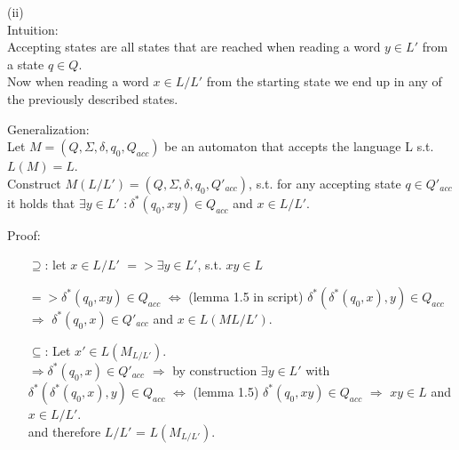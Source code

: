 \noindent (ii)\\
Intuition:\\
Accepting states are all states that are reached when reading a word $y \in L'$ from a state $q \in Q$.\\
Now when reading a word $x \in L/L'$ from the starting state we end up in any of the previously described states.

Generalization:\\
Let $M = (Q, \Sigma, \delta, q_0, Q_{acc})$ be an automaton that accepts the language L s.t. $L(M) = L$.\\
Construct $M(L/L') = (Q, \Sigma, \delta, q_0, Q'_{acc})$, s.t. for any accepting state $q \in Q'_{acc}$  it holds that  $\exists y \in L'$  $: \delta^*(q_0,xy) \in Q_{acc}$ and $x \in L/L'$.

Proof:
\begin{itemize}
    \item[$\supseteq$:] let $x \in L / L'$
      $=> \exists y \in L'$, s.t. $xy \in L$

     $ => \delta^{*}(q_0 , xy) \in Q_{acc}$ $\Leftrightarrow$ (lemma 1.5 in script) $ \delta^{*}(\delta^{*}(q_0, x),y) \in Q_{acc}$  $\Rightarrow$ $ \delta^{*}(q_0,x) \in Q'_{acc}$ and $x \in L(M{L/L'})$.

    \item[$\subseteq$:] Let $x' \in L(M_{L/L'})$.\\
    $\Rightarrow \delta^{*}(q_0, x) \in Q'_{acc}$ $\Rightarrow$ by construction $\exists y \in L'$ with $\delta^{*}(\delta^{*}(q_0,x), y) \in Q_{acc}$ $\Leftrightarrow$ (lemma 1.5) $\delta^{*}(q_0, xy) \in Q_{acc}$ $\Rightarrow$ $xy \in L$ and $x \in L / L'$. \\
and therefore $L/L'$ = $L(M_{L/L'})$. \qedsymbol{}

\end{itemize}



